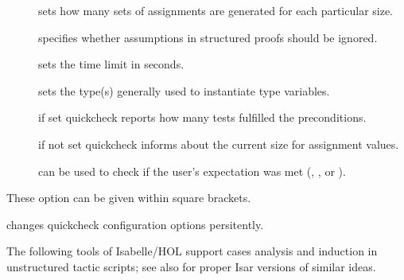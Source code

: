 \begin{isabellebody}
\begin{isamarkuptext}
\begin{description}
\begin{description}
    \item[] sets how many sets of assignments are
    generated for each particular size.

    \item[] specifies whether assumptions in
    structured proofs should be ignored.

    \item[] sets the time limit in seconds.

    \item[] sets the type(s) generally used to
    instantiate type variables.

    \item[] if set quickcheck reports how many tests
    fulfilled the preconditions.

    \item[] if not set quickcheck informs about the
    current size for assignment values.

    \item[] can be used to check if the user's
    expectation was met (, , or ).

    \end{description}

    These option can be given within square brackets.

  \item \hyperlink{command.HOL.quickcheck-params}{\mbox{}} changes quickcheck
    configuration options persitently.

  \end{description}%
\end{isamarkuptext}%
\isamarkuptrue%
%
\isamarkuptrue%
%
\begin{isamarkuptext}%
The following tools of Isabelle/HOL support cases analysis and
  induction in unstructured tactic scripts; see also
   for proper Isar versions of similar ideas.


\end{isamarkuptext}
\end{isabellebody}
